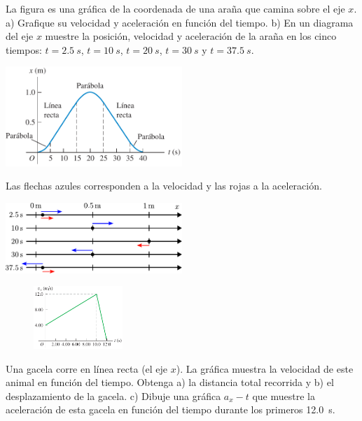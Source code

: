 \documentclass[11pt]{article}
\begin{document}
\begin{exercise}
\begin{multicols}{2}
La figura es una gráfica de la coordenada de una araña que camina sobre el eje $x$. a) Grafique su velocidad y aceleración en función del tiempo. b) En un diagrama del eje $x$ muestre la posición, velocidad y aceleración de la araña en los cinco tiempos: $t = \qty{2.5}{s}$, $t = \qty{10}{s}$, $t = \qty{20}{s}$, $t = \qty{30}{s}$ y $t = \qty{37.5}{s}$.
\begin{center}
    \includegraphics[width=0.5\textwidth]{figs/activ-04.png}
\end{center}
\end{multicols}
\end{exercise}
\begin{solution}
    Las flechas azules corresponden a la velocidad y las rojas a la aceleración.
\begin{center}
    \includegraphics[width=0.5\textwidth]{figs/ac-09.pdf}
\end{center}
\end{solution}

\begin{exercise}
    \begin{figure}
\begin{center}
    \includegraphics[width=0.3\textwidth]{figs/activ-05.png}
\end{center}
\end{figure}
    Una gacela corre en línea recta (el eje $x$). La gráfica muestra la velocidad de este animal en función del tiempo. Obtenga a) la distancia total recorrida y b) el desplazamiento de la gacela. c) Dibuje una gráfica $a_x - t$ que muestre la aceleración de esta gacela en función del tiempo durante los primeros \qty{12.0}{s}.
\end{exercise}
\end{document}
